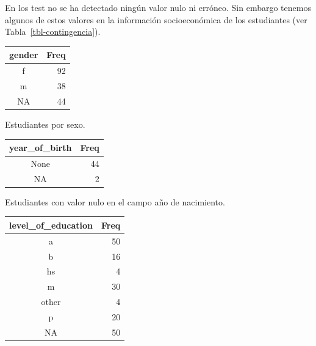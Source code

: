 \documentclass[
  12pt,
  a4paper,
  extrafontsizes,
  onecolumn,
  openright]{memoir}
\begin{document}
En los test no se ha detectado ningún valor nulo ni erróneo. Sin embargo
tenemos algunos de estos valores en la información socioeconómica de los
estudiantes (ver Tabla~\ref{tbl-contingencia}).

\begin{table}

\caption{\label{tbl-contingencia}Tablas de contingencia de la
información socioeconómica de los
estudiantes.}\begin{minipage}[t]{0.50\linewidth}

{\centering 

\hypertarget{tbl-contingencia-1}{}
\begin{longtable}{cr}
\tabularnewline

\toprule
gender & Freq \\ 
\midrule
f & 92 \\ 
m & 38 \\ 
NA & 44 \\ 
\bottomrule
\end{longtable}

Estudiantes por sexo.

}

\end{minipage}%
%
\begin{minipage}[t]{0.50\linewidth}

{\centering 

\hypertarget{tbl-contingencia-2}{}
\begin{longtable}{cr}
\tabularnewline

\toprule
year\_of\_birth & Freq \\ 
\midrule
None & 44 \\ 
NA & 2 \\ 
\bottomrule
\end{longtable}

Estudiantes con valor nulo en el campo año de nacimiento.

}

\end{minipage}%
\newline
\begin{minipage}[t]{0.50\linewidth}

{\centering 

\hypertarget{tbl-contingencia-3}{}
\begin{longtable}{cr}
\tabularnewline

\toprule
level\_of\_education & Freq \\ 
\midrule
a & 50 \\ 
b & 16 \\ 
hs & 4 \\ 
m & 30 \\ 
other & 4 \\ 
p & 20 \\ 
NA & 50 \\ 
\bottomrule
\end{longtable}

}
\end{minipage}
\end{table}
\end{document}
